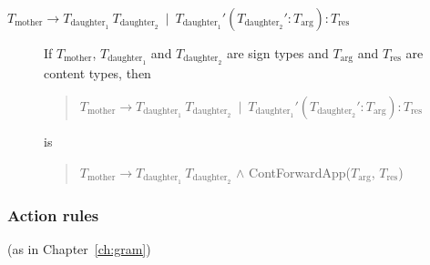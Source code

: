 \begin{description}


\item[\textnormal{$T_{\text{mother}}\longrightarrow
    T_{\text{daughter}_1}\ T_{\text{daughter}_2}\ \mid\
    T_{\text{daughter}_1}'(T_{\text{daughter}_2}':T_{\text{arg}}):T_{\text{res}}$}]
  \mbox{}

  If $T_{\text{mother}}$, $T_{\text{daughter}_1}$ and
  $T_{\text{daughter}_2}$ are sign types and $T_{\text{arg}}$ and
  $T_{\text{res}}$ are content types, then
  \begin{quote}
    $T_{\text{mother}}\longrightarrow
    T_{\text{daughter}_1}\ T_{\text{daughter}_2}\ \mid\
    T_{\text{daughter}_1}'(T_{\text{daughter}_2}':T_{\text{arg}}):T_{\text{res}}$
  \end{quote}
  is
  \begin{quote}
  $T_{\text{mother}}\longrightarrow
    T_{\text{daughter}_1}\ T_{\text{daughter}_2}$ \d{\d{$\wedge$}}
    ContForwardApp($T_{\text{arg}}$, $T_{\text{res}}$)
  \end{quote}

  


  
  

\end{description}


\subsubsection{Action rules} (as in Chapter~\ref{ch:gram})


  







